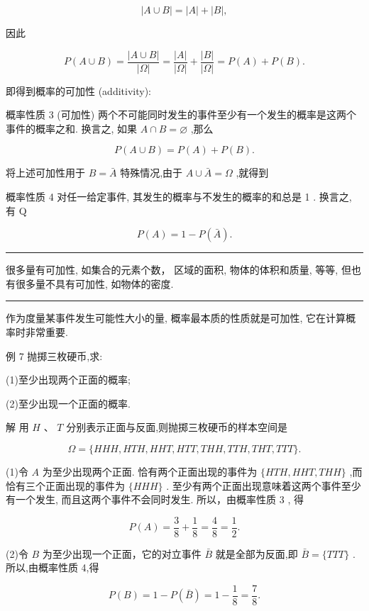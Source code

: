 \documentclass[10pt]{article}
\newcommand{\HRule}{\begin{center}\rule{0.9\linewidth}{0.2mm}\end{center}}
\begin{document}
\[
\left| {A \cup  B}\right|  = \left| A\right|  + \left| B\right| ,
\]

因此

\[
P\left( {A \cup  B}\right)  = \frac{\left| A \cup  B\right| }{\left| \Omega \right| } = \frac{\left| A\right| }{\left| \Omega \right| } + \frac{\left| B\right| }{\left| \Omega \right| } = P\left( A\right)  + P\left( B\right) .
\]

即得到概率的可加性 (additivity):

概率性质 3 (可加性) 两个不可能同时发生的事件至少有一个发生的概率是这两个事件的概率之和. 换言之, 如果 \(A \cap  B = \varnothing\) ,那么

\[
P\left( {A \cup  B}\right)  = P\left( A\right)  + P\left( B\right) .
\]

将上述可加性用于 \(B = \bar{A}\) 特殊情况,由于 \(A \cup  \bar{A} = \Omega\) ,就得到

概率性质 4 对任一给定事件, 其发生的概率与不发生的概率的和总是 1 . 换言之, 有 Q

\[
P\left( A\right)  = 1 - P\left( \bar{A}\right) .
\]

\HRule

很多量有可加性, 如集合的元素个数， 区域的面积, 物体的体积和质量, 等等, 但也有很多量不具有可加性, 如物体的密度.

\HRule

作为度量某事件发生可能性大小的量, 概率最本质的性质就是可加性, 它在计算概率时非常重要.





例 7 抛掷三枚硬币,求:

(1)至少出现两个正面的概率;

(2)至少出现一个正面的概率.

解 用 \(H\text{ 、 }T\) 分别表示正面与反面,则抛掷三枚硬币的样本空间是

\[
\Omega  = \{ {HHH},{HTH},{HHT},{HTT},{THH},{TTH},{THT},{TTT}\} .
\]

(1)令 \(A\) 为至少出现两个正面. 恰有两个正面出现的事件为 \(\{ {HTH},{HHT},{THH}\}\) ,而恰有三个正面出现的事件为 \(\{ {HHH}\}\) . 至少有两个正面出现意味着这两个事件至少有一个发生, 而且这两个事件不会同时发生. 所以，由概率性质 3 , 得

\[
P\left( A\right)  = \frac{3}{8} + \frac{1}{8} = \frac{4}{8} = \frac{1}{2}.
\]

(2)令 \(B\) 为至少出现一个正面，它的对立事件 \(\bar{B}\) 就是全部为反面,即 \(\bar{B} = \{ {TTT}\}\) . 所以,由概率性质 4,得

\[
P\left( B\right)  = 1 - P\left( \bar{B}\right)  = 1 - \frac{1}{8} = \frac{7}{8}.
\]
\end{document}
